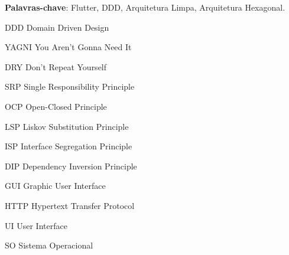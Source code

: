 \documentclass[12pt, %
openright, 
oneside, %
a4paper,    %
brazil]{facom-ufu-abntex2}
\begin{document}





\begin{resumo} %


    \vspace{\onelineskip}

    \noindent
    \textbf{Palavras-chave}: Flutter, DDD, Arquitetura Limpa, Arquitetura Hexagonal. %
\end{resumo}

\listoffigures*
\cleardoublepage




\begin{siglas} %
    \item[DDD] Domain Driven Design
    \item[YAGNI] You Aren't Gonna Need It
    \item[DRY] Don't Repeat Yourself
    \item[SRP] Single Responsibility Principle
    \item[OCP] Open-Closed Principle
    \item[LSP] Liskov Substitution Principle
    \item[ISP] Interface Segregation Principle
    \item[DIP] Dependency Inversion Principle
    \item[GUI] Graphic User Interface
    \item[HTTP] Hypertext Transfer Protocol
    \item[UI] User Interface
    \item[SO] Sistema Operacional
\end{siglas}
\end{document}
